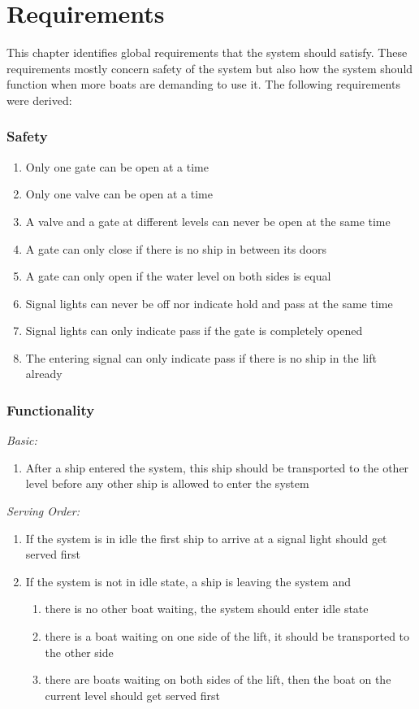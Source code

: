 \section{Requirements}
This chapter identifies global requirements that the system should satisfy. These requirements mostly concern safety of the system but also how the system should function when more boats are demanding to use it. The following requirements were derived:

\subsubsection*{Safety}
\begin{enumerate}
	\item Only one gate can be open at a time
	\item Only one valve can be open at a time
	\item A valve and a gate at different levels can never be open at the same time
	\item A gate can only close if there is no ship in between its doors
	\item A gate can only open if the water level on both sides is equal
	\item Signal lights can never be off nor indicate hold and pass at the same time
	\item Signal lights can only indicate pass if the gate is completely opened
	\item The entering signal can only indicate pass if there is no ship in the lift already
\end{enumerate}

\subsubsection*{Functionality}
\textit{Basic:}
\begin{enumerate}
	\item After a ship entered the system, this ship should be transported to the other level before any other ship is allowed to enter the system
\end{enumerate}
\textit{Serving Order:}
\begin{enumerate}
	\item If the system is in idle the first ship to arrive at a signal light should get served first
	\item If the system is not in idle state, a ship is leaving the system and
	\begin{enumerate}
		\item there is no other boat waiting, the system should enter idle state
		\item there is a boat waiting on one side of the lift, it should be transported to the other side
		\item there are boats waiting on both sides of the lift, then the boat on the current level should get served first
	\end{enumerate}
\end{enumerate}
